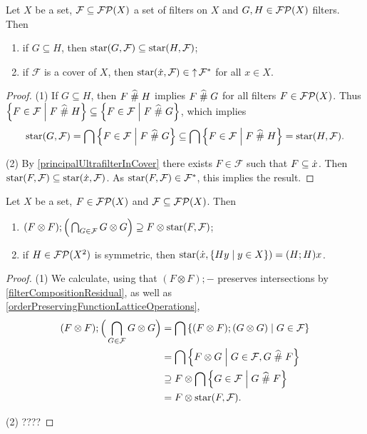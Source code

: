 \begin{lemma} \label{starFilterOrderingLemma}
Let $X$ be a set, $\mathcal{F} \subseteq \operatorname{\mathcal{FP}}(X)$ a set of filters on $X$ and $G,H\in \operatorname{\mathcal{FP}}(X)$ filters. Then
\begin{enumerate}
\item if $G\subseteq H$, then $\operatorname{star}(G,\mathcal{F}) \subseteq \operatorname{star}(H,\mathcal{F})$;
\item if $\mathcal{F}$ is a cover of $X$, then $\operatorname{star}(\dot{x}, \mathcal{F}) \in \operatorname{\uparrow} \mathcal{F}^*$ for all $x\in X$.
\end{enumerate}
\end{lemma}
\begin{proof}
(1) If $G\subseteq H$, then $F\mathrel{\widehat{\#}} H$ implies $F\mathrel{\widehat{\#}} G$ for all filters $F\in\operatorname{\mathcal{FP}}(X)$. Thus $\left\{ F\in\mathcal{F} \;\middle|\; F\mathrel{\widehat{\#}} H \right\} \subseteq \left\{ F\in\mathcal{F} \;\middle|\; F\mathrel{\widehat{\#}} G \right\}$, which implies
\[ \operatorname{star}(G,\mathcal{F}) = \bigcap\left\{ F\in\mathcal{F} \;\middle|\; F\mathrel{\widehat{\#}} G \right\} \subseteq \bigcap\left\{ F\in\mathcal{F} \;\middle|\; F\mathrel{\widehat{\#}} H \right\} = \operatorname{star}(H,\mathcal{F}). \]

(2) By \ref{principalUltrafilterInCover} there exists $F\in \mathcal{F}$ such that $F\subseteq \dot{x}$. Then $\operatorname{star}(F, \mathcal{F}) \subseteq \operatorname{star}(\dot{x}, \mathcal{F})$. As $\operatorname{star}(F, \mathcal{F}) \in \mathcal{F}^*$, this implies the result.
\end{proof}

\begin{lemma}
Let $X$ be a set, $F\in\operatorname{\mathcal{FP}}(X)$ and $\mathcal{F}\subseteq \operatorname{\mathcal{FP}}(X)$. Then
\begin{enumerate}
\item $(F\otimes F);\Big(\bigcap_{G\in \mathcal{F}}G\otimes G\Big) \supseteq F\otimes \operatorname{star}(F, \mathcal{F})$;
\item if $H\in\operatorname{\mathcal{FP}}(X^2)$ is symmetric, then $\operatorname{star}(\dot{x}, \left\{ Hy \;\middle|\; y\in X \right\}) = (H;H)x$.
\end{enumerate}
\end{lemma}
\begin{proof}
(1) We calculate, using that $(F\otimes F);-$ preserves intersections by \ref{filterCompositionResidual}, as well as \ref{orderPreservingFunctionLatticeOperations},
\begin{align*}
(F\otimes F);\Big(\bigcap_{G\in \mathcal{F}}G\otimes G\Big) &= \bigcap \left\{ (F\otimes F); (G\otimes G) \;\middle|\; G\in \mathcal{F} \right\} \\
&= \bigcap \left\{ F\otimes G \;\middle|\; G\in \mathcal{F}, G\mathrel{\widehat{\#}} F \right\} \\
&\supseteq F\otimes \bigcap \left\{ G \in \mathcal{F} \;\middle|\; G\mathrel{\widehat{\#}} F \right\} \\
&= F\otimes \operatorname{star}(F, \mathcal{F}).
\end{align*}

(2) ????
\end{proof}

